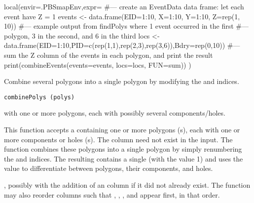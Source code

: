 \documentclass[letterpaper]{book}
\begin{document}
%
\begin{Examples}
\begin{ExampleCode}
local(envir=.PBSmapEnv,expr={
  #--- create an EventData data frame: let each event have Z = 1
  events <- data.frame(EID=1:10, X=1:10, Y=1:10, Z=rep(1, 10))
  #--- example output from findPolys where 1 event occurred in the first
  #--- polygon, 3 in the second, and 6 in the third
  locs <- data.frame(EID=1:10,PID=c(rep(1,1),rep(2,3),rep(3,6)),Bdry=rep(0,10))
  #--- sum the Z column of the events in each polygon, and print the result
  print(combineEvents(events=events, locs=locs, FUN=sum))
})
\end{ExampleCode}
\end{Examples}
%
\begin{Description}\relax
Combine several polygons into a single polygon by modifying the
 and  indices.
\end{Description}
%
\begin{Usage}
\begin{verbatim}
combinePolys (polys)
\end{verbatim}
\end{Usage}
%
\begin{Arguments}
\begin{ldescription}
\item[\code{polys}]  with one or more polygons, each with
possibly several components/holes.
\end{ldescription}
\end{Arguments}
%
\begin{Details}\relax
This function accepts a  containing one or more polygons
(s), each with one or more components or holes
(s).  The  column need not exist in the input.
The function combines these polygons into a single polygon by simply
renumbering the  and  indices.  The resulting
 contains a single  (with the value 1) and uses
the  value to differentiate between polygons, their
components, and holes.  
\end{Details}
%
\begin{Value}
, possibly with the addition of an  column if
it did not already exist.  The function may also reorder columns such
that , , ,  and  appear
first, in that order.
\end{Value}
\end{document}
